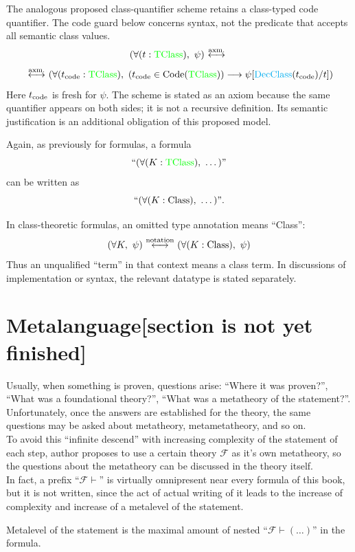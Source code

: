 \begin{axiom}
The analogous proposed class-quantifier scheme retains a class-typed code
quantifier. The code guard below concerns syntax, not the predicate that
accepts all semantic class values.
\[
(\forall (t:{\text{\textcolor{green}{TClass}}}),\ \psi)
\ {\stackrel{{\textrm{axm.}}}{\longleftrightarrow}}\ 
\]
\[
\iffaxm
(\forall (t_\code:\TClass),\ %
(t_\code\in \operatorname{Code}(\TClass))
\implies
\psi[
\DecClass(t_\code)
/
t
]
)
\]
Here $t_{\text{code}}$ is fresh for $\psi$. The scheme is stated as an axiom because
the same quantifier appears on both sides; it is not a recursive definition.
Its semantic justification is an additional obligation of this proposed model.
\end{axiom}
\begin{notation}
Again, as previously for formulas, a formula
\[
``(\forall(K:{\text{\textcolor{green}{TClass}}}),\ \dots)"
\]
can be written as
\[
``(\forall(K:{\text{Class}}),\ \dots)".
\]
\end{notation}


\begin{notation}
In class-theoretic formulas, an omitted type annotation means ``Class'':
\[
(\forall K,\ \psi)
\ {\stackrel{{\textrm{notation}}}{\longleftrightarrow}}\ 
(\forall (K:{\text{Class}}),\ \psi)
\]
Thus an unqualified ``term'' in that context means a class term. In discussions
of implementation or syntax, the relevant datatype is stated separately.
\end{notation}
\iffalse%
\section{Metalanguage[section is not yet finished]}
Usually, when something is proven, questions arise: ``Where it was proven?'', ``What was a foundational theory?'', ``What was a metatheory of the statement?''. Unfortunately, once the answers are established for the theory, the same questions may be asked about metatheory, metametatheory, and so on.\\
To avoid this ``infinite descend'' with increasing complexity of the statement of each step, author proposes to use a certain theory $\mathcal{F}$ as it's own metatheory, so the questions about the metatheory can be discussed in the theory itself.\\%
In fact, a prefix ``$\mathcal{F}\vdash$'' is virtually omnipresent near every formula of this book, but it is not written, since the act of actual writing of it leads to the increase of complexity and increase of a metalevel of the statement.\\
\begin{definition}
Metalevel of the statement is the maximal amount of nested ``$\mathcal{F}\vdash (\dots)$'' in the formula.
\end{definition}


